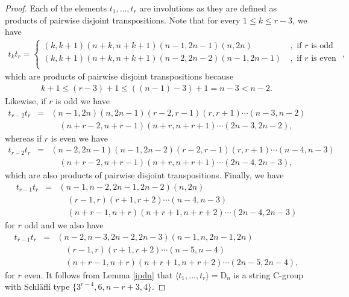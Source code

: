 \documentclass{amsart}
\numberwithin{equation}{section}
\theoremstyle{plain} %
\begin{document}
\begin{proof}
Each of the elements $t_1,\dots,t_r$ are involutions as they are defined as products of pairwise disjoint transpositions. Note that for every $1 \leq k \leq r-3$, we have
\begin{eqnarray*}
t_k t_r = 
\begin{cases}
(k,k+1)(n+k,n+k+1)(n-1,2n-1)(n,2n) \ &, \text{ if $r$ is odd } \\ 
(k,k+1)(n+k,n+k+1)(n-2,2n-2)(n-1,2n-1) \ &, \text{ if $r$ is even } \\
\end{cases},
\end{eqnarray*}
which are products of pairwise disjoint transpositions because 
\begin{eqnarray*}
    k+1 \leq (r-3)+1 \leq ((n-1)-3)+1 = n-3 < n-2.
\end{eqnarray*}
Likewise, if $r$ is odd we have
\begin{eqnarray*}
t_{r-2} t_r &=& (n-1,2n)(n,2n-1) (r-2,r-1)(r,r+1)\cdots(n-3,n-2) \\ &\phantom{=}& \quad(n+r-2,n+r-1)(n+r,n+r+1)\cdots(2n-3,2n-2),
\end{eqnarray*}
whereas if $r$ is even we have
\begin{eqnarray*}
t_{r-2} t_r &=& (n-2,2n-1)(n-1,2n-2)(r-2,r-1)(r,r+1)\cdots(n-4,n-3) \\ &\phantom{=}&\quad (n+r-2,n+r-1)(n+r,n+r+1)\cdots(2n-4,2n-3),
\end{eqnarray*}
which are also products of pairwise disjoint transpositions. Finally, we have
\begin{eqnarray*}
t_{r-1} t_r &=& (n-1,n-2,2n-1,2n-2)(n,2n) \\ &\phantom{=}& \quad(r-1,r)(r+1,r+2)\cdots(n-4,n-3) \\ &\phantom{=}& \quad (n+r-1,n+r)(n+r+1,n+r+2)\cdots(2n-4,2n-3)
\end{eqnarray*}
for $r$ odd and we also have
\begin{eqnarray*}
t_{r-1} t_r &=& (n-2,n-3,2n-2,2n-3)(n-1,n,2n-1,2n) \\ &\phantom{=}&\quad (r-1,r)(r+1,r+2)\cdots(n-5,n-4) \\ &\phantom{=}&\quad (n+r-1,n+r)(n+r+1,n+r+2)\cdots(2n-5,2n-4),
\end{eqnarray*}
for $r$ even. It follows from Lemma \ref{ipdn} that $\langle t_1,\dots,t_r \rangle=\mathrm{D}_n$ is a string C-group with Schl\"{a}fli type $\{3^{r-4},6,n-r+3,4\}$.
\end{proof}
\end{document}
